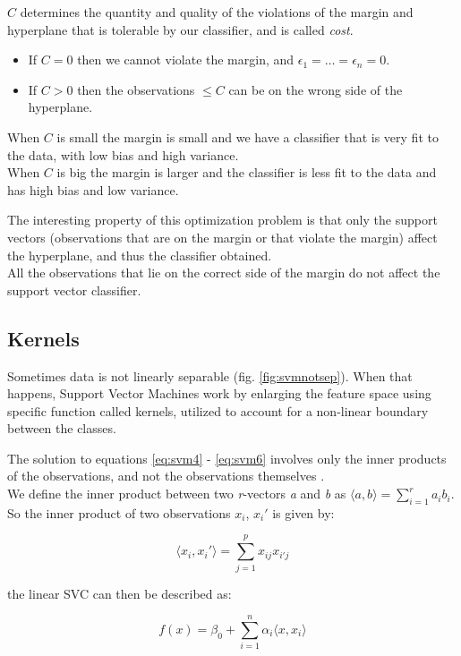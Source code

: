 $C$ determines the quantity and quality of the violations of the margin and hyperplane that is tolerable by our classifier, and is called \textit{cost}.
\begin{itemize}[noitemsep]
	\item If $C = 0$ then we cannot violate the margin, and $\epsilon_1 = \dots = \epsilon_n = 0$.
	\item If $C > 0$ then the observations $\le C$ can be on the wrong side of the hyperplane.
\end{itemize} 

When $C$ is small the margin is small and we have a classifier that is very fit to the data, with low bias and high variance. \\
When $C$ is big the margin is larger and the classifier is less fit to the data and has high bias and low variance.

The interesting property of this optimization problem is that only the support vectors (observations that are on the margin or that violate the margin) affect the hyperplane, and thus the classifier obtained. \\
All the observations that lie on the correct side of the margin do not affect the support vector classifier.

\subsection{Kernels} \label{kernel}
Sometimes data is not linearly separable (fig. \ref{fig:svmnotsep}). When that happens, Support Vector Machines work by enlarging the feature space using specific function called kernels, utilized to account for a non-linear boundary between the classes.

The solution to equations \ref{eq:svm4} - \ref{eq:svm6} involves only the inner products of the observations, and not the observations themselves \cite{ISLR}.\\
We define the inner product between two \textit{r}-vectors \textit{a} and \textit{b} as $	\langle a,b \rangle = \sum_{i=1}^{r} a_{i}b_{i}$. So the inner product of two observations $x_i$, $x_i'$ is given by:

\begin{equation} \label{eq:svm9}
	\langle x_i, x_i' \rangle = \sum_{j=1}^{p} x_{ij}x_{i'j}
\end{equation}

the linear SVC can then be described as:

\begin{equation} \label{eq:svm10}
	f(x) = \beta_0 + \sum_{i=1}^{n} \alpha_i \langle x, x_i \rangle
\end{equation}

